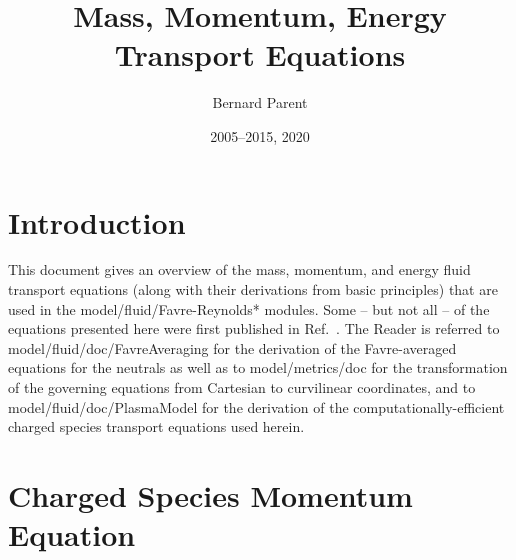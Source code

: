 \documentclass{warpdoc}
\author{
  Bernard Parent
}
\title{
  Mass, Momentum, Energy Transport Equations
}
\date{
  2005--2015, 2020
}
\begin{document}
  \pagestyle{headings}
  \setcounter{page}{1}
  \makewarpdoctitle
  \tableofcontents
  \makenomenclature


\section{Introduction}

This document gives an overview of the mass, momentum, and energy fluid transport equations (along with their derivations from basic principles) that are used in the model/fluid/\textunderscore Favre-Reynolds* modules. Some -- but not all -- of the equations presented here were first published in Ref.\ \cite{aiaa:2016:parent}. The Reader is referred to  model/fluid/doc/Favre\textunderscore Averaging for the derivation of the Favre-averaged equations for the neutrals as well as to model/metrics/doc for the transformation of the governing equations from Cartesian to curvilinear coordinates, and to model/fluid/doc/Plasma\textunderscore Model for the derivation of the computationally-efficient charged species transport equations used herein.



\section{Charged Species Momentum Equation}
\end{document}
